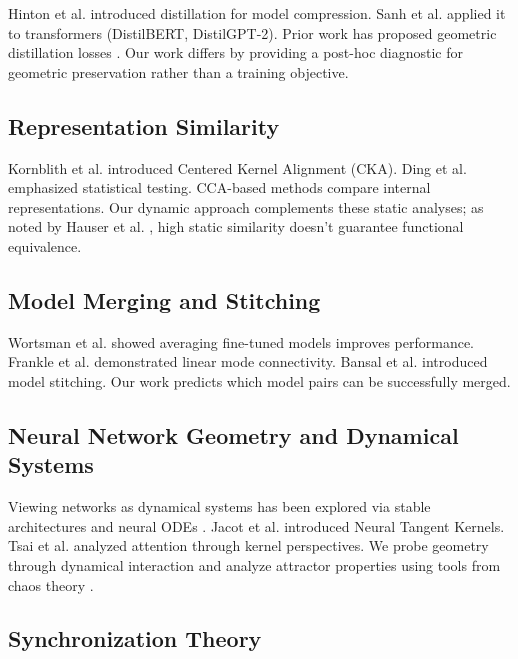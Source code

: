 \documentclass[10pt]{article} %
\theoremstyle{plain}
\theoremstyle{definition}
\theoremstyle{remark}
\begin{document}
Hinton et al. \cite{hinton2015distilling} introduced distillation for model compression. Sanh et al. \cite{sanh2019distilbert} applied it to transformers (DistilBERT, DistilGPT-2). Prior work has proposed geometric distillation losses \cite{li2019deepgkd,liu2023embeddistill,yuan2021manifoldkd}. Our work differs by providing a post-hoc diagnostic for geometric preservation rather than a training objective.

\subsection{Representation Similarity}

Kornblith et al. \cite{kornblith2019similarity} introduced Centered Kernel Alignment (CKA). Ding et al. \cite{ding2021grounding} emphasized statistical testing. CCA-based methods \cite{raghu2017svcca} compare internal representations. Our dynamic approach complements these static analyses; as noted by Hauser et al. \cite{hauser2021similar}, high static similarity doesn't guarantee functional equivalence.

\subsection{Model Merging and Stitching}

Wortsman et al. \cite{wortsman2022model} showed averaging fine-tuned models improves performance. Frankle et al. \cite{frankle2020linear} demonstrated linear mode connectivity. Bansal et al. \cite{bansal2021stitching} introduced model stitching. Our work predicts which model pairs can be successfully merged.

\subsection{Neural Network Geometry and Dynamical Systems}

Viewing networks as dynamical systems has been explored via stable architectures and neural ODEs \cite{haber2017stable,chen2018neuralode}. Jacot et al. \cite{jacot2018neural} introduced Neural Tangent Kernels. Tsai et al. \cite{tsai2019transformer} analyzed attention through kernel perspectives. We probe geometry through dynamical interaction and analyze attractor properties using tools from chaos theory \cite{wolf1985,grassberger1983}.

\subsection{Synchronization Theory}
\end{document}
